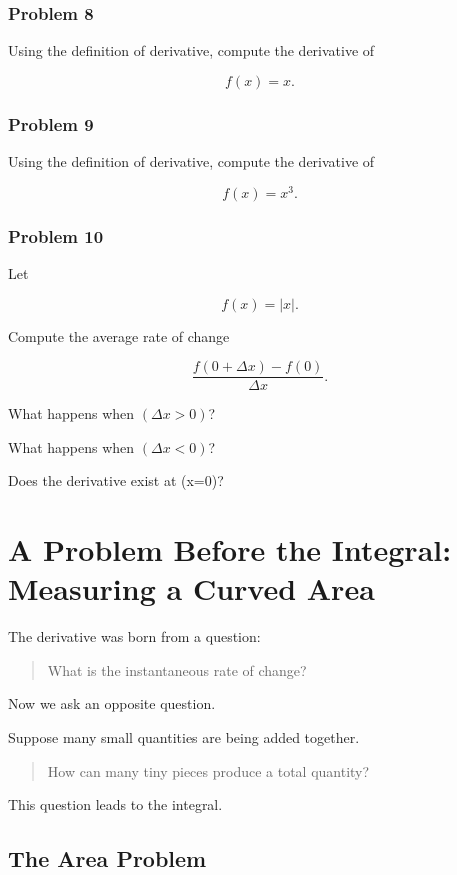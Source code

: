 \subsubsection*{Problem 8}

Using the definition of derivative, compute the derivative of

\[
f(x)=x.
\]

\subsubsection*{Problem 9}

Using the definition of derivative, compute the derivative of

\[
f(x)=x^3.
\]

\subsubsection*{Problem 10}

Let

\[
f(x)=|x|.
\]

Compute the average rate of change

\[
\frac{f(0+\Delta x)-f(0)}{\Delta x}.
\]

What happens when $(\Delta x>0)$?

What happens when $(\Delta x<0)$?

Does the derivative exist at (x=0)?

\section{A Problem Before the Integral: Measuring a Curved Area}

The derivative was born from a question:

\begin{quote}
What is the instantaneous rate of change?
\end{quote}

Now we ask an opposite question.

Suppose many small quantities are being added together.

\begin{quote}
How can many tiny pieces produce a total quantity?
\end{quote}

This question leads to the integral.

\subsection{The Area Problem}

